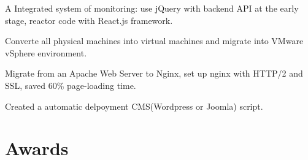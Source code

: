 \documentclass[]{deedy-resume-openfont}
\begin{document}
\begin{minipage}[t]{0.45\textwidth}
\begin{tightemize}
    \item A Integrated system of monitoring: use jQuery with backend API at the early stage, reactor code with React.js framework.
\end{tightemize}
\sectionsep

\begin{tightemize}
    \item Converte all physical machines into virtual machines and migrate into VMware vSphere environment.
    \item Migrate from an Apache Web Server to Nginx, set up nginx with HTTP/2 and SSL, saved 60\% page-loading time.
    \item Created a automatic delpoyment CMS(Wordpress or Joomla) script.
\end{tightemize}
\sectionsep



\section{Awards}


\sectionsep

%
%

\end{minipage}
\hfill
\end{document}
